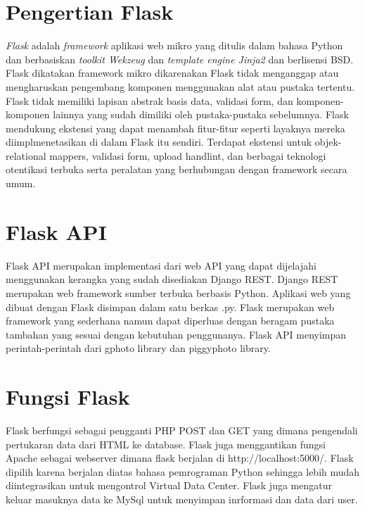 
\section{Pengertian Flask}
\emph{Flask} adalah \emph{framework} aplikasi web mikro yang ditulis dalam bahasa Python dan berbasiskan \emph{toolkit Wekzeug} dan \emph{template engine Jinja2} dan berlisensi BSD. Flask dikatakan framework mikro dikarenakan Flask tidak menganggap atau mengharuskan pengembang komponen menggunakan alat atau pustaka tertentu. Flask tidak memiliki lapisan abstrak basis data, validasi form, dan komponen-komponen lainnya yang sudah dimiliki oleh pustaka-pustaka sebelumnya. Flask mendukung ekstensi yang dapat menambah fitur-fitur seperti layaknya mereka diimplmenetasikan di dalam Flask itu sendiri. Terdapat ekstensi untuk objek-relational mappers, validasi form, upload handlint, dan berbagai teknologi otentikasi terbuka serta peralatan yang berhubungan dengan framework secara umum\cite{solihin2016implementasi}.

\section{Flask API}
Flask API merupakan implementasi dari web API yang dapat dijelajahi menggunakan kerangka yang sudah disediakan Django REST. Django REST merupakan web framework sumber terbuka berbasis Python. Aplikasi web yang dibuat dengan Flask disimpan dalam satu berkas .py. Flask merupakan web framework yang sederhana namun dapat diperluas dengan beragam pustaka tambahan yang sesuai dengan kebutuhan penggunanya. Flask API menyimpan perintah-perintah dari gphoto library dan piggyphoto library\cite{computingaplikasi}. 

\section{Fungsi Flask}
Flask berfungsi sebagai pengganti PHP POST dan GET yang dimana pengendali pertukaran data dari HTML ke database. Flask juga menggantikan fungsi Apache sebagai webserver dimana flask berjalan di http://localhost:5000/.
Flask dipilih karena berjalan diatas bahasa pemrograman Python sehingga lebih mudah diintegrasikan untuk mengontrol Virtual Data Center. Flask juga mengatur keluar masuknya data ke MySql untuk menyimpan inrformasi dan data dari user\cite{alauddin2017implementasi}.

